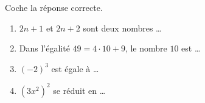 %
%
    Coche la réponse correcte.

    \begin{enumerate}
        \item $2n+1$ et $2n+2$ sont deux nombres \dots
        \item Dans l'égalité $49=4\cdot10+9$, le nombre $10$ est \dots
        \item $(-2)^3$ est égale à \dots
        \item $\left(3x^2\right)^2$ se réduit en \dots
    \end{enumerate}

